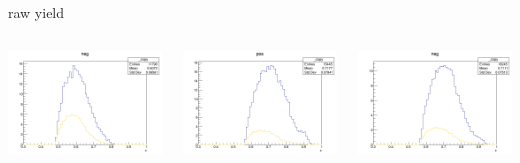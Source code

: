 \begin{frame}{raw yield}
\begin{columns}
\begin{column}[T]{0.25\textwidth}
\includegraphics[width = \textwidth]{results/yield/statistics/yield_x_Q2_z_0.50_3.979_0.60_neg.png}
\end{column}
\begin{column}[T]{0.25\textwidth}
\includegraphics[width = \textwidth]{results/yield/statistics/yield_x_Q2_z_0.50_3.979_0.70_pos.png}
\end{column}
\begin{column}[T]{0.25\textwidth}
\includegraphics[width = \textwidth]{results/yield/statistics/yield_x_Q2_z_0.50_3.979_0.70_neg.png}
\end{column}
\end{columns}
\end{frame}
